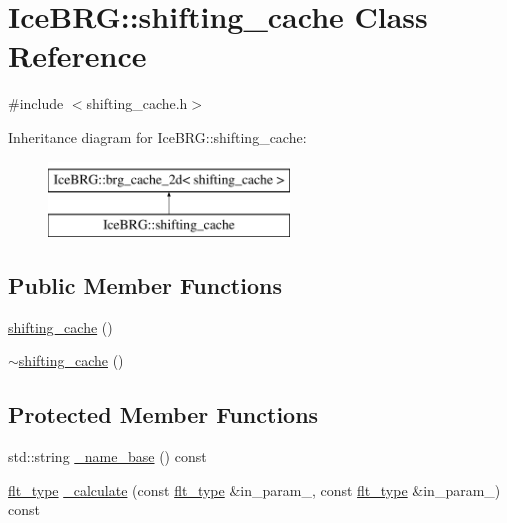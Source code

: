 \hypertarget{classIceBRG_1_1shifting__cache}{\section{Ice\-B\-R\-G\-:\-:shifting\-\_\-cache Class Reference}
\label{classIceBRG_1_1shifting__cache}
}


{\ttfamily \#include $<$shifting\-\_\-cache.\-h$>$}

Inheritance diagram for Ice\-B\-R\-G\-:\-:shifting\-\_\-cache\-:\begin{figure}[H]
\begin{center}
\leavevmode
\includegraphics[height=2.000000cm]{classIceBRG_1_1shifting__cache}
\end{center}
\end{figure}
\subsection*{Public Member Functions}
\begin{DoxyCompactItemize}
\item 
\hyperlink{classIceBRG_1_1shifting__cache_a92a3afff41a2a906a84ae92e646e2d54}{shifting\-\_\-cache} ()
\item 
\hyperlink{classIceBRG_1_1shifting__cache_a79341fd1ec6588a16c669259b319b74c}{$\sim$shifting\-\_\-cache} ()
\end{DoxyCompactItemize}
\subsection*{Protected Member Functions}
\begin{DoxyCompactItemize}
\item 
std\-::string \hyperlink{classIceBRG_1_1shifting__cache_a6b8e62883a72521632375c7e98ddc6c2}{\-\_\-name\-\_\-base} () const 
\item 
\hyperlink{lib_2IceBRG__main_2common_8h_ad0f130a56eeb944d9ef2692ee881ecc4}{flt\-\_\-type} \hyperlink{classIceBRG_1_1shifting__cache_a5e61b8f959110a8efdc74ab34f268444}{\-\_\-calculate} (const \hyperlink{lib_2IceBRG__main_2common_8h_ad0f130a56eeb944d9ef2692ee881ecc4}{flt\-\_\-type} \&in\-\_\-param\-\_, const \hyperlink{lib_2IceBRG__main_2common_8h_ad0f130a56eeb944d9ef2692ee881ecc4}{flt\-\_\-type} \&in\-\_\-param\-\_) const 
\end{DoxyCompactItemize}
